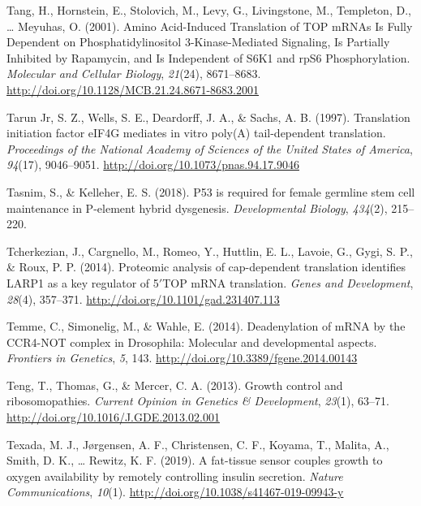 \documentclass[12pt,oneside]{reedthesis}
\newlength{\cslhangindent}
\newenvironment{cslreferences}%
  {\setlength{\parindent}{0pt}%
  \everypar{\setlength{\hangindent}{\cslhangindent}}\ignorespaces}%
  {\par}
\begin{document}
\begin{cslreferences}
\leavevmode\hypertarget{ref-tangAminoAcidInducedTranslation2001}{}%
Tang, H., Hornstein, E., Stolovich, M., Levy, G., Livingstone, M., Templeton, D., \ldots{} Meyuhas, O. (2001). Amino Acid-Induced Translation of TOP mRNAs Is Fully Dependent on Phosphatidylinositol 3-Kinase-Mediated Signaling, Is Partially Inhibited by Rapamycin, and Is Independent of S6K1 and rpS6 Phosphorylation. \emph{Molecular and Cellular Biology}, \emph{21}(24), 8671--8683. \url{http://doi.org/10.1128/MCB.21.24.8671-8683.2001}

\leavevmode\hypertarget{ref-TarunJr1997l}{}%
Tarun Jr, S. Z., Wells, S. E., Deardorff, J. A., \& Sachs, A. B. (1997). Translation initiation factor eIF4G mediates in vitro poly(A) tail-dependent translation. \emph{Proceedings of the National Academy of Sciences of the United States of America}, \emph{94}(17), 9046--9051. \url{http://doi.org/10.1073/pnas.94.17.9046}

\leavevmode\hypertarget{ref-Tasnim2018a}{}%
Tasnim, S., \& Kelleher, E. S. (2018). P53 is required for female germline stem cell maintenance in P-element hybrid dysgenesis. \emph{Developmental Biology}, \emph{434}(2), 215--220.

\leavevmode\hypertarget{ref-Tcherkezian2014b}{}%
Tcherkezian, J., Cargnello, M., Romeo, Y., Huttlin, E. L., Lavoie, G., Gygi, S. P., \& Roux, P. P. (2014). Proteomic analysis of cap-dependent translation identifies LARP1 as a key regulator of 5\({'}\)TOP mRNA translation. \emph{Genes and Development}, \emph{28}(4), 357--371. \url{http://doi.org/10.1101/gad.231407.113}

\leavevmode\hypertarget{ref-Temme2014j}{}%
Temme, C., Simonelig, M., \& Wahle, E. (2014). Deadenylation of mRNA by the CCR4-NOT complex in Drosophila: Molecular and developmental aspects. \emph{Frontiers in Genetics}, \emph{5}, 143. \url{http://doi.org/10.3389/fgene.2014.00143}

\leavevmode\hypertarget{ref-Teng2013}{}%
Teng, T., Thomas, G., \& Mercer, C. A. (2013). Growth control and ribosomopathies. \emph{Current Opinion in Genetics \& Development}, \emph{23}(1), 63--71. \url{http://doi.org/10.1016/J.GDE.2013.02.001}

\leavevmode\hypertarget{ref-Texada2019}{}%
Texada, M. J., Jørgensen, A. F., Christensen, C. F., Koyama, T., Malita, A., Smith, D. K., \ldots{} Rewitz, K. F. (2019). A fat-tissue sensor couples growth to oxygen availability by remotely controlling insulin secretion. \emph{Nature Communications}, \emph{10}(1). \url{http://doi.org/10.1038/s41467-019-09943-y}


\end{cslreferences}
\end{document}
